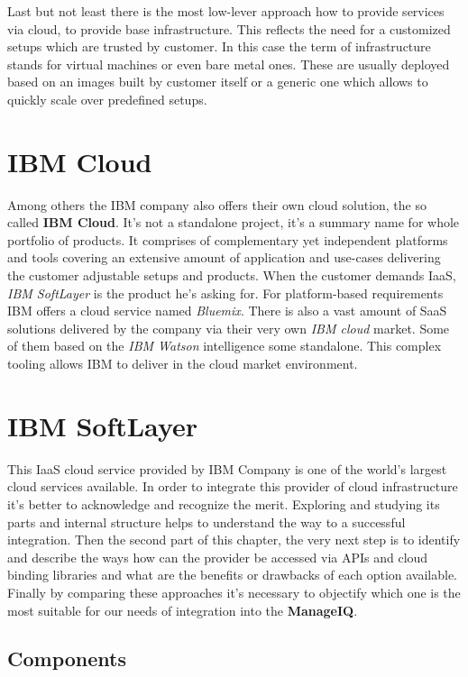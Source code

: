 Last but not least there is the most low-lever approach how to provide services via cloud, to provide base infrastructure. This reflects the need for a customized setups which are trusted by customer. In this case the term of infrastructure stands for virtual machines or even bare metal ones. These are usually deployed based on an images built by customer itself or a generic one which allows to quickly scale over predefined setups.

\chapter{IBM Cloud}
\label{chap:IBM Cloud}

Among others the IBM company also offers their own cloud solution, the so called \textbf{IBM Cloud}. It's not a standalone project, it's a summary name for whole portfolio of products. It comprises of complementary yet independent platforms and tools covering an extensive amount of application and use-cases delivering the customer adjustable setups and products. When the customer demands IaaS, \emph{IBM SoftLayer} is the product he's asking for. For platform-based requirements IBM offers a cloud service named \emph{Bluemix}. There is also a vast amount of SaaS solutions delivered by the company via their very own \emph{IBM cloud} market. Some of them based on the \emph{IBM Watson} intelligence some standalone. This complex tooling allows IBM to deliver in the cloud market environment.

\chapter{IBM SoftLayer}
\label{chap:IBM SoftLayer}

This IaaS cloud service provided by IBM Company is one of the world's largest cloud services available. In order to integrate this provider of cloud infrastructure it's better to acknowledge and recognize the merit. Exploring and studying its parts and internal structure helps to understand the way to a successful integration. Then the second part of this chapter, the very next step is to identify and describe the ways how can the provider be accessed via APIs and cloud binding libraries and what are the benefits or drawbacks of each option available. Finally by comparing these approaches it's necessary to objectify which one is the most suitable for our needs of integration into the \textbf{ManageIQ}.

\section{Components}
\label{sec:Components}

